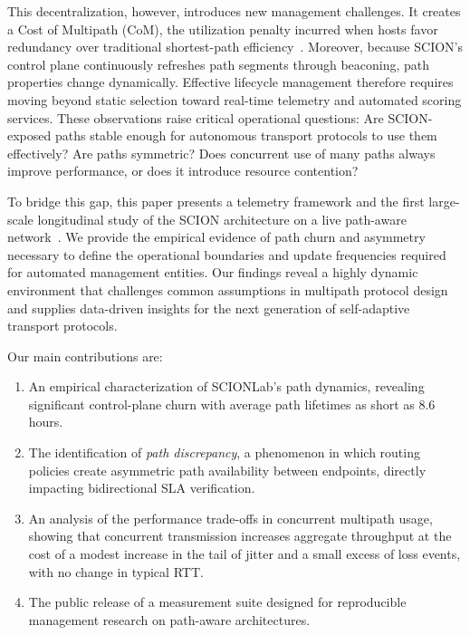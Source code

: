 \documentclass[pdflatex,sn-vancouver-num]{sn-jnl}%
\theoremstyle{thmstyleone}%
\theoremstyle{thmstyletwo}%
\theoremstyle{thmstylethree}%
\begin{document}
    This decentralization, however, introduces new management challenges. 
    It creates a Cost of Multipath (CoM), the utilization penalty incurred when hosts favor redundancy over traditional shortest-path efficiency~\cite{kruger2021early, CK05}. 
    Moreover, because SCION's control plane continuously refreshes path segments through beaconing, path properties change dynamically. 
    Effective lifecycle management therefore requires moving beyond static selection toward real-time telemetry and automated scoring services. 
    These observations raise critical operational questions: Are SCION-exposed paths stable enough for autonomous transport protocols to use them effectively? Are paths symmetric? Does concurrent use of many paths always improve performance, or does it introduce resource contention?
    
    To bridge this gap, this paper presents a telemetry framework and the first large-scale longitudinal study of the SCION architecture on a live path-aware network~\cite{kwon2020scionlab}. 
    We provide the empirical evidence of path churn and asymmetry necessary to define the operational boundaries and update frequencies required for automated management entities. 
    Our findings reveal a highly dynamic environment that challenges common assumptions in multipath protocol design and supplies data-driven insights for the next generation of self-adaptive transport protocols.
    
    Our main contributions are:
    \begin{enumerate}
        \item An empirical characterization of SCIONLab's path dynamics, revealing significant control-plane churn with average path lifetimes as short as 8.6 hours.
        \item The identification of \textit{path discrepancy}, a phenomenon in which routing policies create asymmetric path availability between endpoints, directly impacting bidirectional SLA verification.
        \item An analysis of the performance trade-offs in concurrent multipath usage, showing that concurrent transmission increases aggregate throughput at the cost of a modest increase in the tail of jitter and a small excess of loss events, with no change in typical RTT.
        \item The public release of a measurement suite designed for reproducible management research on path-aware architectures.
    \end{enumerate}
        
\end{document}

